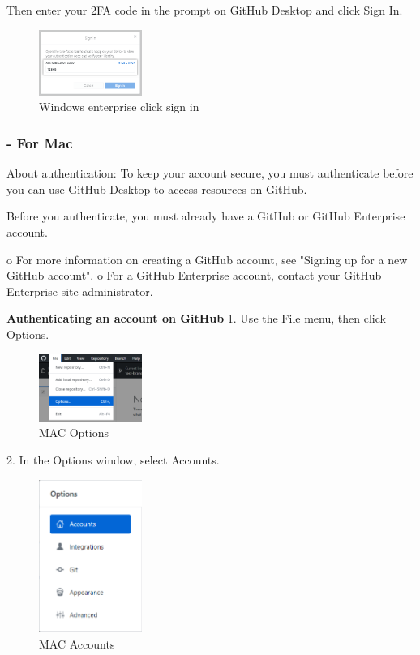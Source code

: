 Then enter your 2FA code in the prompt on GitHub Desktop and click Sign In.
\begin{figure}[ht]
    \centering
    \includegraphics[width=0.3\textwidth]{figures/WIN EN click Sign In.png}
    \caption{Windows enterprise click sign in }
\end{figure}



\subsubsection{- For Mac }


About authentication:
To keep your account secure, you must authenticate before you can use GitHub Desktop to access resources on GitHub.

Before you authenticate, you must already have a GitHub or GitHub Enterprise account.

o For more information on creating a GitHub account, see "Signing up for a new GitHub account".
o For a GitHub Enterprise account, contact your GitHub Enterprise site administrator.


\textbf{Authenticating an account on GitHub}
1.	Use the File menu, then click Options.

\begin{figure}[ht]
    \centering
    \includegraphics[width=0.3\textwidth]{figures/MAC Options.png}
    \caption{MAC Options}
\end{figure}

2.	In the Options window, select Accounts.

\begin{figure}[ht]
    \centering
    \includegraphics[width=0.3\textwidth]{figures/MAC Accounts.png}
    \caption{MAC Accounts}
\end{figure}

